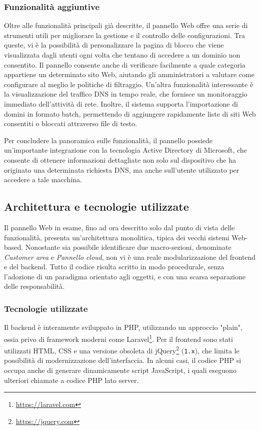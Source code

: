 \subsubsection{Funzionalità aggiuntive}
Oltre alle funzionalità principali già descritte, il pannello Web offre una serie di strumenti utili per migliorare la gestione e il controllo delle configurazioni. Tra queste, vi è la possibilità di personalizzare la pagina di blocco che viene visualizzata dagli utenti ogni volta che tentano di accedere a un dominio non consentito.
%
Il pannello consente anche di verificare facilmente a quale categoria appartiene un determinato sito Web, aiutando gli amministratori a valutare come configurare al meglio le politiche di filtraggio.
%
Un’altra funzionalità interessante è la visualizzazione del traffico DNS in tempo reale, che fornisce un monitoraggio immediato dell’attività di rete. Inoltre, il sistema supporta l'importazione di domini in formato batch, permettendo di aggiungere rapidamente liste di siti Web consentiti o bloccati attraverso file di testo.

Per concludere la panoramica sulle funzionalità, il pannello possiede un'importante integrazione con la tecnologia Active Directory di Microsoft, che consente di ottenere informazioni dettagliate non solo sul dispositivo che ha originato una determinata richiesta DNS, ma anche sull’utente utilizzato per accedere a tale macchina.

\subsection{Architettura e tecnologie utilizzate}
Il pannello Web in esame, fino ad ora descritto solo dal punto di vista delle funzionalità, presenta un'architettura monolitica, tipica dei vecchi sistemi Web-based. Nonostante sia possibile identificare due macro-sezioni, denominate \textit{Customer area} e \textit{Pannello cloud}, non vi è una reale modularizzazione del frontend e del backend. Tutto il codice risulta scritto in modo procedurale, senza l’adozione di un paradigma orientato agli oggetti, e con una scarsa separazione delle responsabilità.

\subsubsection{Tecnologie utilizzate}
Il backend è interamente sviluppato in PHP, utilizzando un approccio "plain", ossia privo di framework moderni come Laravel\footnote{\url{https://laravel.com}}. Per il frontend sono stati utilizzati HTML, CSS e una versione obsoleta di jQuery\footnote{\url{https://jquery.com}} (\texttt{1.x}), che limita le possibilità di modernizzazione dell'interfaccia. In alcuni casi, il codice PHP si occupa anche di generare dinamicamente script JavaScript, i quali eseguono ulteriori chiamate a codice PHP lato server.


